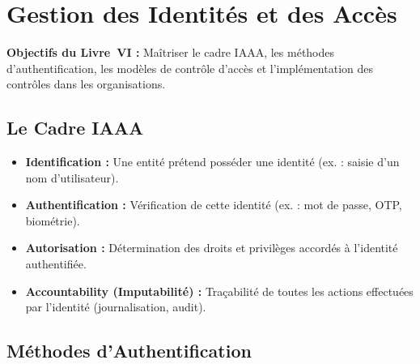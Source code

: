 
\chapter{Gestion des Identités et des Accès}
\label{chap:iam}

\begin{boxobjectifs}
\textbf{Objectifs du Livre~VI :} Maîtriser le cadre IAAA, les méthodes d'authentification, les modèles de contrôle d'accès et l'implémentation des contrôles dans les organisations.
\end{boxobjectifs}

\section{Le Cadre IAAA}

\begin{boxdef}
\begin{itemize}
    \item \textbf{Identification :} Une entité prétend posséder une identité (ex. : saisie d'un nom d'utilisateur).
    \item \textbf{Authentification :} Vérification de cette identité (ex. : mot de passe, OTP, biométrie).
    \item \textbf{Autorisation :} Détermination des droits et privilèges accordés à l'identité authentifiée.
    \item \textbf{Accountability (Imputabilité) :} Traçabilité de toutes les actions effectuées par l'identité (journalisation, audit).
\end{itemize}
\end{boxdef}

\section{Méthodes d'Authentification}

